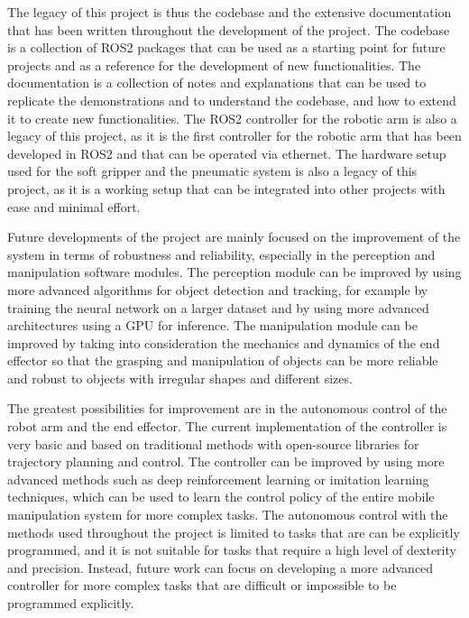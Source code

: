 The legacy of this project is thus the codebase and the extensive documentation that has been written throughout
the development of the project. The codebase is a collection of ROS2 packages that can be used as a starting point
for future projects and as a reference for the development of new functionalities. The documentation is a collection
of notes and explanations that can be used to replicate the demonstrations and to understand the codebase,
and how to extend it to create new functionalities. The ROS2 controller for the robotic arm is also a legacy of
this project, as it is the first controller for the robotic arm that has been developed in ROS2 and that can be
operated via ethernet. The hardware setup used for the soft gripper and the pneumatic system is also a legacy of
this project, as it is a working setup that can be integrated into other projects with ease and minimal effort.


Future developments of the project are mainly focused on the improvement of the system in terms of robustness and
reliability, especially in the perception and manipulation software modules. The perception module can be improved by
using more advanced algorithms for object detection and tracking, for example by training the neural network
on a larger dataset and by using more advanced architectures using a GPU for inference. The manipulation module
can be improved by taking into consideration the mechanics and dynamics of the end effector so that the grasping
and manipulation of objects can be more reliable and robust to objects with irregular shapes and different sizes.

The greatest possibilities for improvement are in the autonomous control of the robot arm and the end effector.
The current implementation of the controller is very basic and based on traditional methods with open-source
libraries for trajectory planning and control. The controller can be improved by using more advanced methods
such as deep reinforcement learning or imitation learning techniques, which can be used to learn the control
policy of the entire mobile manipulation system for more complex tasks. The autonomous control with the
methods used throughout the project is limited to tasks that are can be explicitly programmed, and it is not
suitable for tasks that require a high level of dexterity and precision. Instead, future work can focus on
developing a more advanced controller for more complex tasks that are difficult or impossible to be
programmed explicitly. 